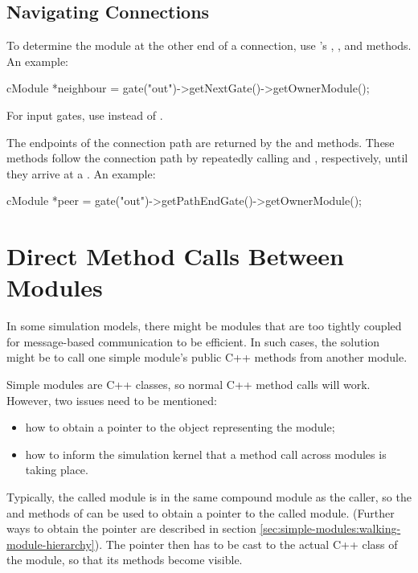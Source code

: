 \subsection{Navigating Connections}
\label{sec:simple-modules:navigating-connections}

To determine the module at the other end of a connection, use
's , , and
 methods. An example:

\begin{cpp}
cModule *neighbour = gate("out")->getNextGate()->getOwnerModule();
\end{cpp}

For input gates, use  instead of .

The endpoints of the connection path are returned by the
 and  
methods. These methods follow the connection path by repeatedly calling
 and , respectively,
until they arrive at a . An example:

\begin{cpp}
cModule *peer = gate("out")->getPathEndGate()->getOwnerModule();
\end{cpp}


\section{Direct Method Calls Between Modules}
\label{sec:simple-modules:direct-method-calls}

In some simulation models, there might be modules that are too
tightly coupled for message-based communication to be efficient.
In such cases, the solution might be to call one simple module's public
C++ methods from another module.

Simple modules are C++ classes, so normal C++ method calls will
work. However, two issues need to be mentioned:

\begin{itemize}
  \item how to obtain a pointer to the object representing the module;
  \item how to inform the simulation kernel that a method call across modules is taking place.
\end{itemize}

Typically, the called module is in the same compound module as the caller,
so the  and  methods of
 can be used to obtain a  pointer to the
called module. (Further ways to obtain the pointer are described
in section \ref{sec:simple-modules:walking-module-hierarchy}).
The  pointer then has to be cast to the actual C++ class
of the module, so that its methods become visible.

